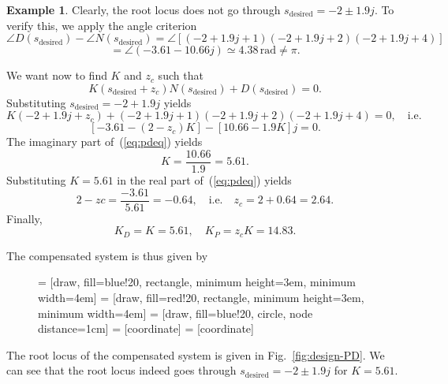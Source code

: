\documentclass[a4paper,11pt]{report}
\theoremstyle{definition}
\newcommand{\des}{\textrm{desired}}
\newtheorem{mdexample}{Example}
\newenvironment{example}%
  {\vspace{0.1cm}\begin{mdframed}[backgroundcolor=lightgray]\begin{mdexample}}%
  {\end{mdexample}\end{mdframed}\vspace{0.1cm}}
\begin{document}
\begin{example}
  Clearly, the root locus does not go through $s_\des=-2\pm1.9j$.  To
  verify this, we apply the angle criterion
  \[
  \angle D(s_\des)-\angle N(s_\des)
  = \angle [(-2+1.9j+1)(-2+1.9j+2)(-2+1.9j+4)] 
  \]
  \[
  = \angle(-3.61-10.66j) \simeq 4.38\,\mathrm{rad}\neq \pi.
  \]
 
  We want now to find $K$ and $z_c$ such that
  \[
  K(s_\des+z_c)N(s_\des)+D(s_\des) = 0.  
  \]
  Substituting $s_\des=-2+1.9j$ yields
  \[
  K(-2+1.9j+z_c) + (-2+1.9j+1)(-2+1.9j+2)(-2+1.9j+4) =0, \quad \textrm{i.e.}
  \]
  \begin{equation}
    \label{eq:pdeq}
    [-3.61-(2-z_c)K] - [10.66-1.9K]j=0.  
  \end{equation}
  The imaginary part of~(\ref{eq:pdeq}) yields 
  \[
  K = \frac{10.66}{1.9} = 5.61.
  \]
  Substituting $K=5.61$ in the real part of~(\ref{eq:pdeq}) yields
  \[
  2-zc = \frac{-3.61}{5.61}=-0.64, \quad \textrm{i.e.} \quad z_c = 2+0.64 = 2.64.
  \]
  Finally,
  \[
  K_D = K = 5.61,\quad K_P= z_cK=14.83.
  \]

  The compensated system is thus given by

  \begin{figure}[H]
    \centering
     = [draw, fill=blue!20, rectangle, minimum height=3em, minimum width=4em]
     = [draw, fill=red!20, rectangle, minimum height=3em, minimum width=4em]
     = [draw, fill=blue!20, circle, node distance=1cm]
     = [coordinate]
     = [coordinate]
  \end{figure}

  The root locus of the compensated system is given in
  Fig.~\ref{fig:design-PD}. We can see that the root locus indeed goes
  through $s_\des=-2\pm1.9j$ for $K=5.61$.


\end{example}
\end{document}
